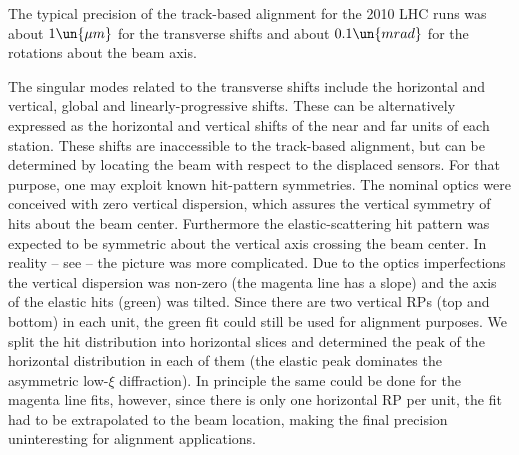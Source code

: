 
The typical precision of the track-based alignment for the 2010 LHC runs was about $1\un{\mu m}$ for the transverse shifts and about $0.1\un{mrad}$ for the rotations about the beam axis.


The singular modes related to the transverse shifts include the horizontal and vertical, global and linearly-progressive shifts. These can be alternatively expressed as the horizontal and vertical shifts of the near and far units of each station. These shifts are inaccessible to the track-based alignment, but can be determined by locating the beam with respect to the displaced sensors. For that purpose, one may exploit known hit-pattern symmetries. The nominal optics were conceived with zero vertical dispersion, which assures the vertical symmetry of hits about the beam center. Furthermore the elastic-scattering hit pattern was expected to be symmetric about the vertical axis crossing the beam center. In reality -- see  -- the picture was more complicated. Due to the optics imperfections the vertical dispersion was non-zero (the magenta line has a slope) and the axis of the elastic hits (green) was tilted. Since there are two vertical RPs (top and bottom) in each unit, the green fit could still be used for alignment purposes. We split the hit distribution into horizontal slices and determined the peak of the horizontal distribution in each of them (the elastic peak dominates the asymmetric low-$\xi$ diffraction). In principle the same could be done for the magenta line fits, however, since there is only one horizontal RP per unit, the fit had to be extrapolated to the beam location, making the final precision uninteresting for alignment applications.

